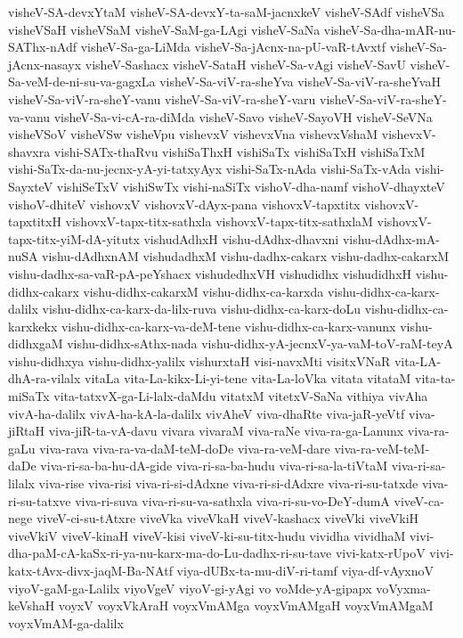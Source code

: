 {visheV-SA-devxYtaM
visheV-SA-devxY-ta-saM-jacnxkeV
visheV-SAdf
visheVSa
visheVSaH
visheVSaM
visheV-SaM-ga-LAgi
visheV-SaNa
visheV-Sa-dha-mAR-nu-SAThx-nAdf
visheV-Sa-ga-LiMda
visheV-Sa-jAcnx-na-pU-vaR-tAvxtf
visheV-Sa-jAcnx-nasayx
visheV-Sashacx
visheV-SataH
visheV-Sa-vAgi
visheV-SavU
visheV-Sa-veM-de-ni-su-va-gagxLa
visheV-Sa-viV-ra-sheYva
visheV-Sa-viV-ra-sheYvaH
visheV-Sa-viV-ra-sheY-vanu
visheV-Sa-viV-ra-sheY-varu
visheV-Sa-viV-ra-sheY-va-vanu
visheV-Sa-vi-cA-ra-diMda
visheV-Savo
visheV-SayoVH
visheV-SeVNa
visheVSoV
visheVSw
visheVpu
vishevxV
vishevxVna
vishevxVshaM
vishevxV-shavxra
vishi-SATx-thaRvu
vishiSaThxH
vishiSaTx
vishiSaTxH
vishiSaTxM
vishi-SaTx-da-nu-jecnx-yA-yi-tatxyAyx
vishi-SaTx-nAda
vishi-SaTx-vAda
vishi-SayxteV
vishiSeTxV
vishiSwTx
vishi-naSiTx
vishoV-dha-namf
vishoV-dhayxteV
vishoV-dhiteV
vishovxV
vishovxV-dAyx-pana
vishovxV-tapxtitx
vishovxV-tapxtitxH
vishovxV-tapx-titx-sathxla
vishovxV-tapx-titx-sathxlaM
vishovxV-tapx-titx-yiM-dA-yitutx
vishudAdhxH
vishu-dAdhx-dhavxni
vishu-dAdhx-mA-nuSA
vishu-dAdhxnAM
vishudadhxM
vishu-dadhx-cakarx
vishu-dadhx-cakarxM
vishu-dadhx-sa-vaR-pA-peYshacx
vishudedhxVH
vishudidhx
vishudidhxH
vishu-didhx-cakarx
vishu-didhx-cakarxM
vishu-didhx-ca-karxda
vishu-didhx-ca-karx-dalilx
vishu-didhx-ca-karx-da-lilx-ruva
vishu-didhx-ca-karx-doLu
vishu-didhx-ca-karxkekx
vishu-didhx-ca-karx-va-deM-tene
vishu-didhx-ca-karx-vanunx
vishu-didhxgaM
vishu-didhx-sAthx-nada
vishu-didhx-yA-jecnxV-ya-vaM-toV-raM-teyA
vishu-didhxya
vishu-didhx-yalilx
vishurxtaH
visi-navxMti
visitxVNaR
vita-LA-dhA-ra-vilalx
vitaLa
vita-La-kikx-Li-yi-tene
vita-La-loVka
vitata
vitataM
vita-ta-miSaTx
vita-tatxvX-ga-Li-lalx-daMdu
vitatxM
vitetxV-SaNa
vithiya
vivAha
vivA-ha-dalilx
vivA-ha-kA-la-dalilx
vivAheV
viva-dhaRte
viva-jaR-yeVtf
viva-jiRtaH
viva-jiR-ta-vA-davu
vivara
vivaraM
viva-raNe
viva-ra-ga-Lanunx
viva-ra-gaLu
viva-rava
viva-ra-va-daM-teM-doDe
viva-ra-veM-dare
viva-ra-veM-teM-daDe
viva-ri-sa-ba-hu-dA-gide
viva-ri-sa-ba-hudu
viva-ri-sa-la-tiVtaM
viva-ri-sa-lilalx
viva-rise
viva-risi
viva-ri-si-dAdxne
viva-ri-si-dAdxre
viva-ri-su-tatxde
viva-ri-su-tatxve
viva-ri-suva
viva-ri-su-va-sathxla
viva-ri-su-vo-DeY-dumA
viveV-ca-nege
viveV-ci-su-tAtxre
viveVka
viveVkaH
viveV-kashacx
viveVki
viveVkiH
viveVkiV
viveV-kinaH
viveV-kisi
viveV-ki-su-titx-hudu
vividha
vividhaM
vivi-dha-paM-cA-kaSx-ri-ya-nu-karx-ma-do-Lu-dadhx-ri-su-tave
vivi-katx-rUpoV
vivi-katx-tAvx-divx-jaqM-Ba-NAtf
viya-dUBx-ta-mu-diV-ri-tamf
viya-df-vAyxnoV
viyoV-gaM-ga-Lalilx
viyoVgeV
viyoV-gi-yAgi
vo
voMde-yA-gipapx
voVyxma-keVshaH
voyxV
voyxVkAraH
voyxVmAMga
voyxVmAMgaH
voyxVmAMgaM
voyxVmAM-ga-dalilx
}
